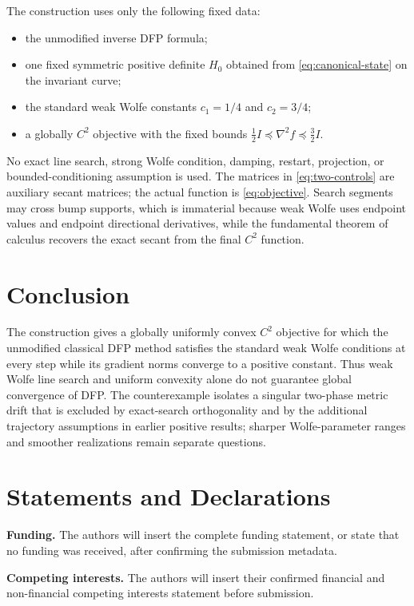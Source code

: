 \documentclass[smallextended,envcountsame]{svjour3}
\begin{document}
The construction uses only the following fixed data:
\begin{itemize}
\item the unmodified inverse DFP formula;
\item one fixed symmetric positive definite $H_0$ obtained from
  \eqref{eq:canonical-state} on the invariant curve;
\item the standard weak Wolfe constants $c_1=1/4$ and $c_2=3/4$;
\item a globally $C^2$ objective with the fixed bounds
  $\frac12I\preceq\nabla^2f\preceq\frac32I$.
\end{itemize}
No exact line search, strong Wolfe condition, damping, restart, projection,
or bounded-conditioning assumption is used.  The matrices in
\eqref{eq:two-controls} are auxiliary secant matrices; the
actual function is \eqref{eq:objective}.  Search segments may cross bump
supports, which is immaterial because weak Wolfe uses endpoint values and
endpoint directional derivatives, while the fundamental theorem of calculus
recovers the exact secant from the final $C^2$ function.

\section{Conclusion}

The construction gives a globally uniformly convex $C^2$ objective for which
the unmodified classical DFP method satisfies the standard weak Wolfe
conditions at every step while its gradient norms converge to a positive
constant.  Thus weak Wolfe line search and uniform convexity alone do not
guarantee global convergence of DFP.  The counterexample isolates a singular
two-phase metric drift that is excluded by exact-search orthogonality and by
the additional trajectory assumptions in earlier positive results; sharper
Wolfe-parameter ranges and smoother realizations remain separate questions.

\section*{Statements and Declarations}

\textbf{Funding.}
The authors will insert the complete funding statement, or state that no
funding was received, after confirming the submission metadata.

\textbf{Competing interests.}
The authors will insert their confirmed financial and non-financial competing
interests statement before submission.
\end{document}
